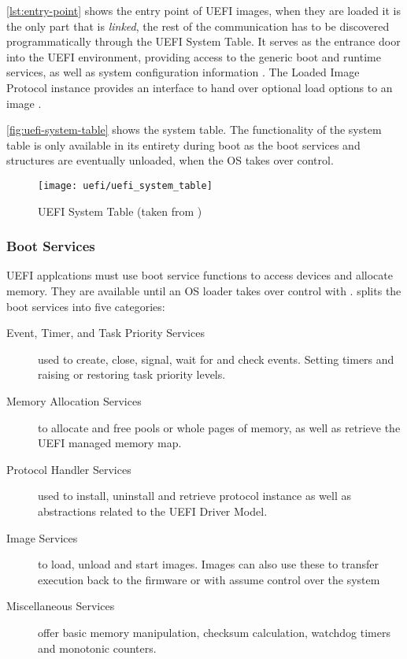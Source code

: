 

\autoref{lst:entry-point} shows the entry point of \ac{UEFI} images, when they are loaded it is the only part that is \emph{linked}, the rest of the communication has to be discovered programmatically through the \ac{UEFI} System Table.
It serves as the entrance door into the \ac{UEFI} environment, providing access to the generic boot and runtime services, as well as system configuration information \cite[Section 3.3]{tianocore-edk2-driver-writer-s-guide}.
The Loaded Image Protocol instance provides an interface to hand over optional load options to an image \cite{beyond-bios}.

\autoref{fig:uefi-system-table} shows the system table.
The functionality of the system table is only available in its entirety during boot as the boot services and structures are eventually unloaded, when the \ac{OS} takes over control.

\begin{figure}[htb]%
    \centering%
    \texttt{[image: uefi/uefi\_system\_table]}%
    \caption{\ac{UEFI} System Table (taken from \cite[Vol 2, Figure 2-5]{pi-spec})}%
    \label{fig:uefi-system-table}%
\end{figure}

\subsubsection{Boot Services}

\ac{UEFI} applcations must use boot service functions to access devices and allocate memory.
They are available until an \ac{OS} loader takes over control with .
\cite[Section 7]{uefi-spec} splits the boot services into five categories:

\begin{description}
    \item [Event, Timer, and Task Priority Services] used to create, close, signal, wait for and check events. Setting timers and raising or restoring task priority levels.
    \item [Memory Allocation Services] to allocate and free pools or whole pages of memory, as well as retrieve the \ac{UEFI} managed memory map.
    \item [Protocol Handler Services] used to install, uninstall and retrieve protocol instance as well as abstractions related to the \ac{UEFI} Driver Model.
    \item [Image Services] to load, unload and start images. Images can also use these to transfer execution back to the firmware or with  assume control over the system
    \item [Miscellaneous Services] offer basic memory manipulation, checksum calculation, watchdog timers and monotonic counters.
\end{description}

